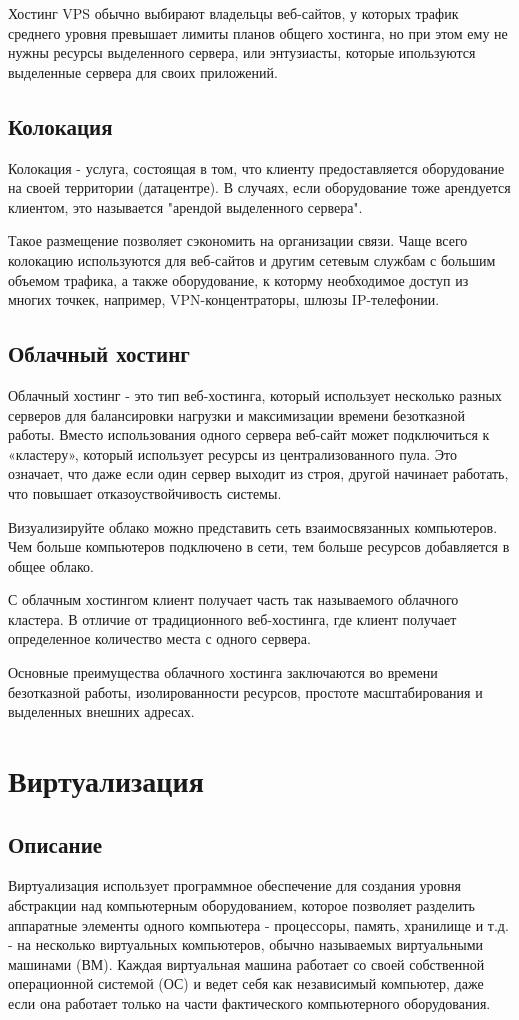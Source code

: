 Хостинг VPS обычно выбирают владельцы веб-сайтов, у которых трафик среднего уровня превышает лимиты планов общего хостинга, но при этом ему не нужны ресурсы выделенного сервера, или энтузиасты, которые ипользуются выделенные сервера для своих приложений.

\subsection{Колокация}\label{sec:colo_hosting}
Колокация - услуга, состоящая в том, что клиенту предоставляется оборудование на своей территории (датацентре). В случаях, если оборудование тоже арендуется клиентом, это называется "арендой выделенного сервера".

Такое размещение позволяет сэкономить на организации связи. Чаще всего колокацию используются для веб-сайтов и другим сетевым службам с большим объемом трафика, а также оборудование, к которму необходимое  доступ из многих точкек, например, VPN-концентраторы, шлюзы IP-телефонии.

\subsection{Облачный хостинг}\label{sec:cloud_hosting}
Облачный хостинг - это тип веб-хостинга, который использует несколько разных серверов для балансировки нагрузки и максимизации времени безотказной работы. Вместо использования одного сервера веб-сайт может подключиться к «кластеру», который использует ресурсы из централизованного пула. Это означает, что даже если один сервер выходит из строя, другой начинает работать, что повышает отказоуствойчивость системы.

Визуализируйте облако можно представить сеть взаимосвязанных компьютеров. Чем больше компьютеров подключено в сети, тем больше ресурсов добавляется в общее облако.

С облачным хостингом клиент получает часть так называемого облачного кластера. В отличие от традиционного веб-хостинга, где клиент получает определенное количество места с одного сервера.

Основные преимущества облачного хостинга заключаются во времени безотказной работы, изолированности ресурсов, простоте масштабирования и выделенных внешних адресах.

\section{Виртуализация}\label{sec:ch1/sec2}
\subsection{Описание}\label{sec:virt_decs}
Виртуализация использует программное обеспечение для создания уровня абстракции над компьютерным оборудованием, которое позволяет разделить аппаратные элементы одного компьютера - процессоры, память, хранилище и т.д. - на несколько виртуальных компьютеров, обычно называемых виртуальными машинами (ВМ). Каждая виртуальная машина работает со своей собственной операционной системой (ОС) и ведет себя как независимый компьютер, даже если она работает только на части фактического компьютерного оборудования.

